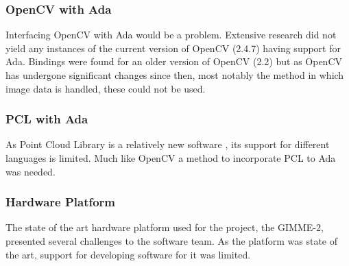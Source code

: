 \subsubsection{OpenCV with Ada}
Interfacing OpenCV with Ada would be a problem. Extensive research did not yield any instances of the current version of OpenCV (2.4.7) having support for Ada. Bindings were found for an older version of OpenCV (2.2) \cite{web:oldAdaBindings} but as OpenCV has undergone significant changes since then, most notably the method in which image data is handled, these could not be used.

\subsubsection{PCL with Ada}
As Point Cloud Library is a relatively new software \cite{Rusu_ICRA2011_PCL}, its support for different languages is limited. Much like OpenCV a method to incorporate PCL to Ada was needed.

\subsubsection{Hardware Platform}
The state of the art hardware platform used for the project, the GIMME-2, presented several challenges to the software team. As the platform was state of the art, support for developing software for it was limited.
